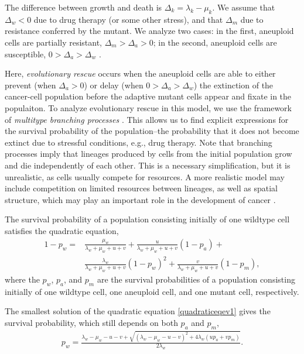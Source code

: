 \documentclass[12pt]{extarticle}
\begin{document}
The difference between growth and death is $\Delta_k = \lambda_k-\mu_k$.
We assume that $\Delta_w<0$ due to drug therapy (or some other stress), and that $\Delta_m$ due to resistance conferred by the mutant.
We analyze two cases: in the first, aneuploid cells are partially resistant, $\Delta_m>\Delta_a>0$; in the second, aneuploid cells are susceptible, $0>\Delta_a>\Delta_w$  \cite{brauner2016distinguishing}.

Here, \emph{evolutionary rescue} occurs when the aneuploid cells are able to either prevent (when $\Delta_a>0$) or delay (when $0>\Delta_a>\Delta_w$) the extinction of the cancer-cell population before the adaptive mutant cells appear and fixate in the populaiton.
To analyze evolutionary rescue in this model, we use the framework of \emph{multitype branching processes} \cite{rybnikov2021fitness,harris1963theory}. 
This allows us to find explicit expressions for the survival probability of the population--the probability that it does not become extinct due to stressful conditions, e.g., drug therapy.
Note that branching processes imply that lineages produced by cells from the initial population grow and die independently of each other.
This is a necessary simplification, but it is unrealistic, as cells usually compete for resources.
A more realistic model may include competition on limited resources between lineages, as well as spatial structure, which may play an important role in the development of cancer \cite{martens2011spatial}.

The survival probability of a population consisting initially of one wildtype cell satisfies the quadratic equation,
\begin{equation} \label{quadraticeqev1}
\begin{aligned}
1-p_w = & \frac{\mu_w}{\lambda_w+\mu_w+u+v} + 
		  \frac{u}{\lambda_w+\mu_w+u+v}\left(1-p_a\right) + \\
		  & \frac{\lambda_w}{\lambda_w+\mu_w+u+v}\left(1-p_w\right)^2 +
		  \frac{v}{\lambda_w+\mu_w+u+v}\left(1-p_m\right) ,
\end{aligned}
\end{equation}
where the $p_w$, $p_a$, and $p_m$ are the survival probabilities of a population consisting initially of one wildtype cell, one aneuploid cell, and one mutant cell, respectively.

The smallest solution of the quadratic equation \cref{quadraticeqev1} gives the survival probability, which still depends on both $p_a$ and $p_m$,
\begin{align}\label{survprobw}
p_w=\frac{\lambda_w-\mu_w-u-v+\sqrt{\left(\lambda_w-\mu_w-u-v\right)^2+4\lambda_w\left(up_a+vp_m\right)}}{2\lambda_w} .
\end{align}
\end{document}
